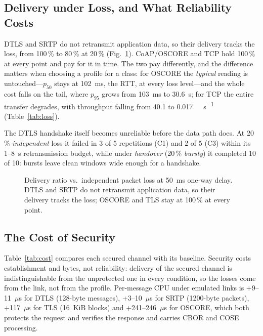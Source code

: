\documentclass[conference]{IEEEtran}
\begin{document}
\subsection{Delivery under Loss, and What Reliability Costs}
DTLS and SRTP do not retransmit application data, so their delivery tracks the
loss, from 100\,\% to 80\,\% at 20\,\% (Fig.~\ref{fig:loss}). CoAP/OSCORE and
TCP hold 100\,\% at every point and pay for it in time. The two pay
differently, and the difference matters when choosing a profile for a class:
for OSCORE the \emph{typical} reading is untouched---$p_{50}$ stays at
\SI{102}{\milli\second}, the RTT, at every loss level---and the whole cost
falls on the tail, where $p_{95}$ grows from \SI{103}{\milli\second} to
\SI{30.6}{\second}; for TCP the entire transfer degrades, with throughput
falling from 40.1 to \SI{0.017}{\mega\bit\per\second}
(Table~\ref{tab:loss}).

The DTLS handshake itself becomes unreliable before the data path does. At
20\,\% \emph{independent} loss it failed in 3 of 5 repetitions (C1) and 2 of 5
(C3) within its 1--8~s retransmission budget, while under \emph{handover}
(20\,\% \emph{bursty}) it completed 10 of 10: bursts leave clean windows wide
enough for a handshake.

\begin{figure}[t]
\centering

\caption{Delivery ratio vs.\ independent packet loss at \SI{50}{\milli\second}
one-way delay. DTLS and SRTP do not retransmit application data, so their
delivery tracks the loss; OSCORE and TLS stay at 100\,\% at every point.}
\label{fig:loss}
\end{figure}



\subsection{The Cost of Security}
Table~\ref{tab:cost} compares each secured channel with its baseline.
Security costs establishment and bytes, not reliability: delivery of the
secured channel is indistinguishable from the unprotected one in every
condition, so the losses come from the link, not from the profile.
Per-message CPU under emulated links is +9--11~$\mu$s for DTLS (128-byte
messages), +3--10~$\mu$s for SRTP (1200-byte packets), +117~$\mu$s for TLS
(16~KiB blocks) and +241--246~$\mu$s for OSCORE, which both protects the
request and verifies the response and carries CBOR and COSE processing.
\end{document}
